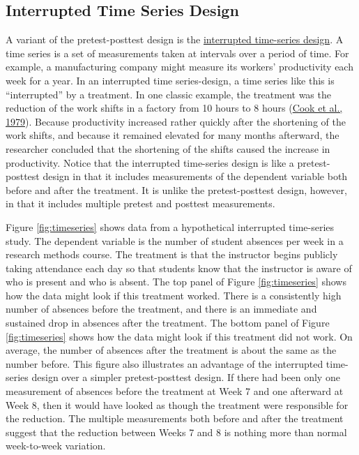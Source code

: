 \documentclass[
]{krantz}
\begin{document}
\hypertarget{interrupted-time-series-design}{%
\subsection*{Interrupted Time Series Design}\label{interrupted-time-series-design}}


A variant of the pretest-posttest design is the \protect\hyperlink{interrupted-time-series-design-1}{interrupted time-series design}. A time series is a set of measurements taken at intervals over a period of time. For example, a manufacturing company might measure its workers' productivity each week for a year. In an interrupted time series-design, a time series like this is ``interrupted'' by a treatment. In one classic example, the treatment was the reduction of the work shifts in a factory from 10 hours to 8 hours (\protect\hyperlink{ref-cook1979quasi}{Cook et al., 1979}). Because productivity increased rather quickly after the shortening of the work shifts, and because it remained elevated for many months afterward, the researcher concluded that the shortening of the shifts caused the increase in productivity. Notice that the interrupted time-series design is like a pretest-posttest design in that it includes measurements of the dependent variable both before and after the treatment. It is unlike the pretest-posttest design, however, in that it includes multiple pretest and posttest measurements.

Figure \ref{fig:timeseries} shows data from a hypothetical interrupted time-series study. The dependent variable is the number of student absences per week in a research methods course. The treatment is that the instructor begins publicly taking attendance each day so that students know that the instructor is aware of who is present and who is absent. The top panel of Figure \ref{fig:timeseries} shows how the data might look if this treatment worked. There is a consistently high number of absences before the treatment, and there is an immediate and sustained drop in absences after the treatment. The bottom panel of Figure \ref{fig:timeseries} shows how the data might look if this treatment did not work. On average, the number of absences after the treatment is about the same as the number before. This figure also illustrates an advantage of the interrupted time-series design over a simpler pretest-posttest design. If there had been only one measurement of absences before the treatment at Week 7 and one afterward at Week 8, then it would have looked as though the treatment were responsible for the reduction. The multiple measurements both before and after the treatment suggest that the reduction between Weeks 7 and 8 is nothing more than normal week-to-week variation.
\end{document}
